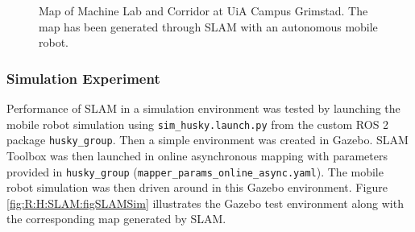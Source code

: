\begin{figure}[H]
  \centering
  
  \caption{Map of Machine Lab and Corridor at UiA Campus Grimstad. The map has been generated through SLAM with an autonomous mobile robot.}
  \label{fig:R:AN:SLAM:figUiaMap}
\end{figure}

\subsubsection{Simulation Experiment}
Performance of SLAM in a simulation environment was tested by launching the mobile robot simulation using \lstinline{sim_husky.launch.py} from the custom ROS 2 package \lstinline{husky_group}. Then a simple environment was created in Gazebo. SLAM Toolbox was then launched in online asynchronous mapping with parameters provided in \lstinline{husky_group} (\lstinline{mapper_params_online_async.yaml}). The mobile robot simulation was then driven around in this Gazebo environment. Figure \ref{fig:R:H:SLAM:figSLAMSim} illustrates the Gazebo test environment along with the corresponding map generated by SLAM.

